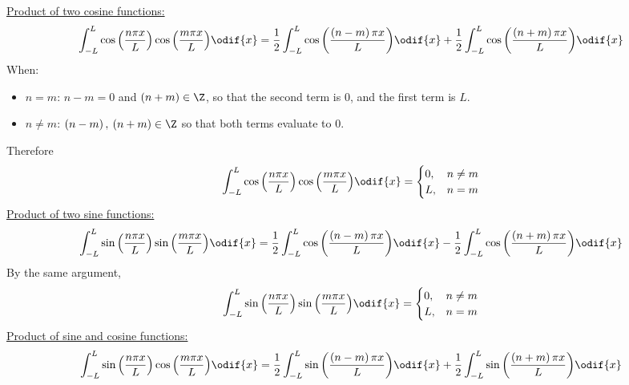 \documentclass{article}
\begin{document}
\underline{Product of two cosine functions:}
\begin{equation*}
    \int_{-L}^L \cos{\left( \frac{n \pi x}{L} \right)} \cos{\left( \frac{m \pi x}{L} \right)} \odif{x} = \frac{1}{2} \int_{-L}^L \cos{\left( \frac{\left( n - m \right) \pi x}{L} \right)} \odif{x} + \frac{1}{2} \int_{-L}^L \cos{\left( \frac{\left( n + m \right) \pi x}{L} \right)} \odif{x}
\end{equation*}
When:
\begin{itemize}
    \item \(n = m\): \(n - m = 0\) and \(\left( n + m \right) \in \Z\), so that the second
          term is \(0\), and the first term is \(L\).
    \item \(n \neq m\): \(\left( n - m \right),\: \left( n + m \right) \in \Z\) so that both terms evaluate to \(0\).
\end{itemize}
Therefore
\begin{equation*}
    \int_{-L}^L \cos{\left( \frac{n \pi x}{L} \right)} \cos{\left( \frac{m \pi x}{L} \right)} \odif{x} = \begin{cases}
        0, & n \neq m \\
        L, & n = m
    \end{cases}
\end{equation*}
\underline{Product of two sine functions:}
\begin{equation*}
    \int_{-L}^L \sin{\left( \frac{n \pi x}{L} \right)} \sin{\left( \frac{m \pi x}{L} \right)} \odif{x} = \frac{1}{2} \int_{-L}^L \cos{\left( \frac{\left( n - m \right) \pi x}{L} \right)} \odif{x} - \frac{1}{2} \int_{-L}^L \cos{\left( \frac{\left( n + m \right) \pi x}{L} \right)} \odif{x}
\end{equation*}
By the same argument,
\begin{equation*}
    \int_{-L}^L \sin{\left( \frac{n \pi x}{L} \right)} \sin{\left( \frac{m \pi x}{L} \right)} \odif{x} = \begin{cases}
        0, & n \neq m \\
        L, & n = m
    \end{cases}
\end{equation*}
\underline{Product of sine and cosine functions:}
\begin{equation*}
    \int_{-L}^L \sin{\left( \frac{n \pi x}{L} \right)} \cos{\left( \frac{m \pi x}{L} \right)} \odif{x} = \frac{1}{2} \int_{-L}^L \sin{\left( \frac{\left( n - m \right) \pi x}{L} \right)} \odif{x} + \frac{1}{2} \int_{-L}^L \sin{\left( \frac{\left( n + m \right) \pi x}{L} \right)} \odif{x}
\end{equation*}
\end{document}
